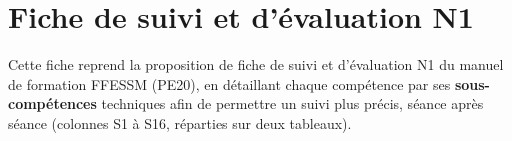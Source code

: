 \section{Fiche de suivi et d'évaluation N1}
\label{sec:fiche-evaluation}

Cette fiche reprend la proposition de fiche de suivi et d'évaluation N1 du manuel de
formation FFESSM (PE20), en détaillant chaque compétence par ses \textbf{sous-compétences}
techniques afin de permettre un suivi plus précis, séance après séance (colonnes S1 à S16,
réparties sur deux tableaux).

\cleartooddpage

\newpage
